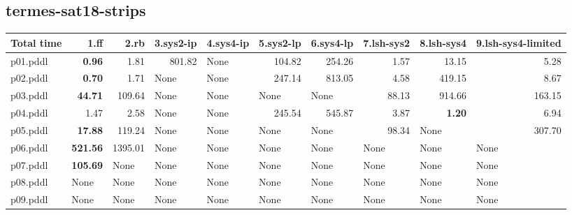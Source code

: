 \documentclass{article}
\begin{document}
\hypertarget{total_time-termes-sat18-strips}{}
\subsection*{termes-sat18-strips}

\begin{tabular}{@{}lrrrrrrrrr@{}}
Total time & 1.ff & 2.rb & 3.sys2-ip & 4.sys4-ip & 5.sys2-lp & 6.sys4-lp & 7.lsh-sys2 & 8.lsh-sys4 & 9.lsh-sys4-limited \\
\midrule
p01.pddl & \textbf{0.96} & 1.81 & 801.82 & \multicolumn{1}{|l|}{None} & 104.82 & 254.26 & 1.57 & 13.15 & 5.28 \\
p02.pddl & \textbf{0.70} & 1.71 & \multicolumn{1}{|l|}{None} & \multicolumn{1}{|l|}{None} & 247.14 & 813.05 & 4.58 & 419.15 & 8.67 \\
p03.pddl & \textbf{44.71} & 109.64 & \multicolumn{1}{|l|}{None} & \multicolumn{1}{|l|}{None} & \multicolumn{1}{|l|}{None} & \multicolumn{1}{|l|}{None} & 88.13 & 914.66 & 163.15 \\
p04.pddl & 1.47 & 2.58 & \multicolumn{1}{|l|}{None} & \multicolumn{1}{|l|}{None} & 245.54 & 545.87 & 3.87 & \textbf{1.20} & 6.94 \\
p05.pddl & \textbf{17.88} & 119.24 & \multicolumn{1}{|l|}{None} & \multicolumn{1}{|l|}{None} & \multicolumn{1}{|l|}{None} & \multicolumn{1}{|l|}{None} & 98.34 & \multicolumn{1}{|l|}{None} & 307.70 \\
p06.pddl & \textbf{521.56} & 1395.01 & \multicolumn{1}{|l|}{None} & \multicolumn{1}{|l|}{None} & \multicolumn{1}{|l|}{None} & \multicolumn{1}{|l|}{None} & \multicolumn{1}{|l|}{None} & \multicolumn{1}{|l|}{None} & \multicolumn{1}{|l|}{None} \\
p07.pddl & \textbf{105.69} & \multicolumn{1}{|l|}{None} & \multicolumn{1}{|l|}{None} & \multicolumn{1}{|l|}{None} & \multicolumn{1}{|l|}{None} & \multicolumn{1}{|l|}{None} & \multicolumn{1}{|l|}{None} & \multicolumn{1}{|l|}{None} & \multicolumn{1}{|l|}{None} \\
p08.pddl & \multicolumn{1}{|l|}{None} & \multicolumn{1}{|l|}{None} & \multicolumn{1}{|l|}{None} & \multicolumn{1}{|l|}{None} & \multicolumn{1}{|l|}{None} & \multicolumn{1}{|l|}{None} & \multicolumn{1}{|l|}{None} & \multicolumn{1}{|l|}{None} & \multicolumn{1}{|l|}{None} \\
p09.pddl & \multicolumn{1}{|l|}{None} & \multicolumn{1}{|l|}{None} & \multicolumn{1}{|l|}{None} & \multicolumn{1}{|l|}{None} & \multicolumn{1}{|l|}{None} & \multicolumn{1}{|l|}{None} & \multicolumn{1}{|l|}{None} & \multicolumn{1}{|l|}{None} & \multicolumn{1}{|l|}{None} \\

\end{tabular}
\end{document}

